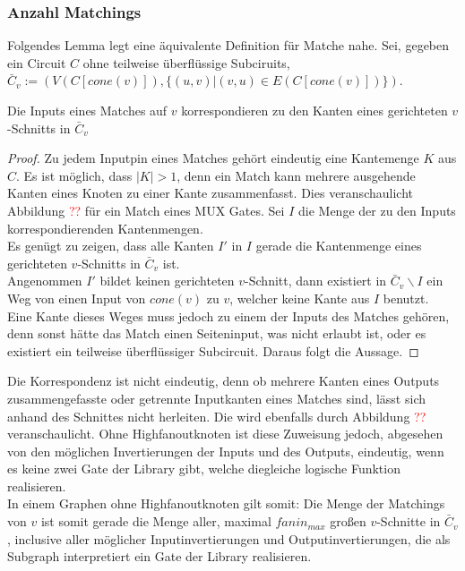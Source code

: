 \documentclass[11pt, a4paper, german]{article}
\begin{document}
\subsubsection{Anzahl Matchings}
\label{subsubsec:anzahl_matchings}
Folgendes Lemma legt eine äquivalente Definition für Matche nahe.
Sei, gegeben ein Circuit $C$ ohne teilweise überflüssige Subciruits, \\$\bar{C}_v := (V(C[cone(v)]), \{ (u,v) | (v,u) \in E(C[cone(v)])\})$. 
\begin{lemma}{Die Inputs eines Matches auf $v$ korrespondieren zu den Kanten eines gerichteten $v$-Schnitts in $\bar{C}_v $}
\end{lemma}
\begin{proof}
Zu jedem Inputpin eines Matches gehört eindeutig eine Kantemenge $K$ aus $C$. Es ist möglich, dass $|K| > 1$, denn ein Match kann mehrere ausgehende Kanten eines Knoten zu einer Kante zusammenfasst. Dies veranschaulicht Abbildung \textcolor{red}{??} für ein Match eines MUX Gates.  Sei $I$ die Menge der zu den Inputs korrespondierenden Kantenmengen.\\ 
Es genügt zu zeigen, dass alle Kanten $I'$ in $I$ gerade die Kantenmenge eines gerichteten $v$-Schnitts in $\bar{C}_v$ ist. \\
Angenommen $I'$ bildet keinen gerichteten $v$-Schnitt, dann existiert in $\bar{C}_v\backslash I$ ein Weg von einen Input von $cone(v)$ zu $v$, welcher keine Kante aus $I$ benutzt. \\
Eine Kante dieses Weges muss jedoch zu einem der Inputs des Matches gehören, denn sonst hätte das Match einen Seiteninput, was nicht erlaubt ist, oder es existiert ein teilweise überflüssiger Subcircuit. Daraus folgt die Aussage. 
\end{proof}
Die Korrespondenz ist nicht eindeutig, denn ob mehrere Kanten eines Outputs zusammengefasste oder getrennte Inputkanten eines Matches sind, lässt sich anhand des Schnittes nicht herleiten. Die wird ebenfalls durch Abbildung \textcolor{red}{??} veranschaulicht. Ohne Highfanoutknoten ist diese Zuweisung jedoch, abgesehen von den möglichen Invertierungen der Inputs und des Outputs, eindeutig, wenn es keine zwei Gate der Library gibt, welche diegleiche  logische Funktion realisieren.\\
In einem Graphen ohne Highfanoutknoten gilt somit: 
Die Menge der Matchings von $v$ ist somit gerade die Menge aller, maximal $fanin_{max}$ großen $v$-Schnitte in $\bar{C}_v$, inclusive aller möglicher Inputinvertierungen und Outputinvertierungen, die als Subgraph interpretiert ein Gate der Library realisieren.
\end{document}
